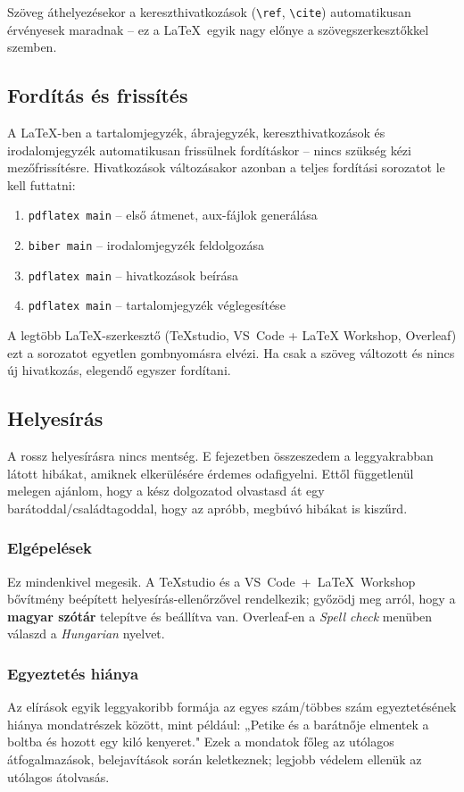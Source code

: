 \documentclass{sapientia-thesis}
\begin{document}
Szöveg áthelyezésekor a kereszthivatkozások (\verb|\ref|, \verb|\cite|) automatikusan érvényesek maradnak -- ez a \LaTeX\ egyik nagy előnye a szövegszerkesztőkkel szemben.

\subsection{Fordítás és frissítés}
A \LaTeX-ben a tartalomjegyzék, ábrajegyzék, kereszthivatkozások és irodalomjegyzék automatikusan frissülnek fordításkor -- nincs szükség kézi mezőfrissítésre. Hivatkozások változásakor azonban a teljes fordítási sorozatot le kell futtatni:

\begin{enumerate}
  \item \texttt{pdflatex main} -- első átmenet, aux-fájlok generálása
  \item \texttt{biber main} -- irodalomjegyzék feldolgozása
  \item \texttt{pdflatex main} -- hivatkozások beírása
  \item \texttt{pdflatex main} -- tartalomjegyzék véglegesítése
\end{enumerate}

A legtöbb \LaTeX-szerkesztő (TeXstudio, VS~Code + LaTeX Workshop, Overleaf) ezt a sorozatot egyetlen gombnyomásra elvézi. Ha csak a szöveg változott és nincs új hivatkozás, elegendő egyszer fordítani.

\subsection{Helyesírás}
A rossz helyesírásra nincs mentség. E fejezetben összeszedem a leggyakrabban látott hibákat, amiknek elkerülésére érdemes odafigyelni. Ettől függetlenül melegen ajánlom, hogy a kész dolgozatod olvastasd át egy barátoddal/családtagoddal, hogy az apróbb, megbúvó hibákat is kiszűrd.

\subsubsection{Elgépelések}
Ez mindenkivel megesik. A TeXstudio és a VS~Code~+~LaTeX~Workshop bővítmény beépített helyesírás-ellenőrzővel rendelkezik; győzödj meg arról, hogy a \textbf{magyar szótár} telepítve és beállítva van. Overleaf-en a \textit{Spell check} menüben válaszd a \textit{Hungarian} nyelvet.

\subsubsection{Egyeztetés hiánya}
Az elírások egyik leggyakoribb formája az egyes szám/többes szám egyeztetésének hiánya mondatrészek között, mint például: „Petike és a barátnője elmentek a boltba és hozott egy kiló kenyeret." Ezek a mondatok főleg az utólagos átfogalmazások, belejavítások során keletkeznek; legjobb védelem ellenük az utólagos átolvasás.
\end{document}
